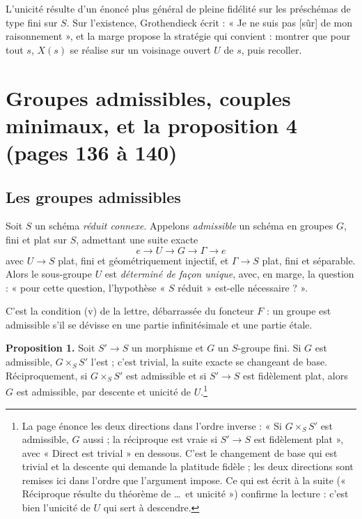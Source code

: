 \documentclass[11pt,a4paper]{article}
\begin{document}

L'unicité résulte d'un énoncé plus général de pleine fidélité sur les
préschémas de type fini sur $S$. Sur l'existence, Grothendieck écrit : « Je ne
suis pas [sûr] de mon raisonnement », et la marge propose la stratégie qui
convient : montrer que pour tout $s$, $X(s)$ se réalise sur un voisinage ouvert
$U$ de $s$, puis recoller.

\section*{Groupes admissibles, couples minimaux, et la proposition 4 (pages 136 à 140)}

\subsection*{Les groupes admissibles}

Soit $S$ un schéma \emph{réduit connexe}. Appelons \emph{admissible} un schéma
en groupes $G$, fini et plat sur $S$, admettant une suite exacte
\[
  e \longrightarrow U \longrightarrow G \longrightarrow \Gamma \longrightarrow
  e
\]
avec $U \to S$ plat, fini et géométriquement injectif, et $\Gamma \to S$ plat,
fini et séparable. Alors le sous-groupe $U$ est \emph{déterminé de façon
unique}, avec, en marge, la question : « pour cette question, l'hypothèse
« $S$ réduit » est-elle nécessaire ? ».

C'est la condition (v) de la lettre, débarrassée du foncteur $F$ : un groupe
est admissible s'il se dévisse en une partie infinitésimale et une partie
étale.

\textbf{Proposition 1.} Soit $S' \to S$ un morphisme et $G$ un $S$-groupe fini.
Si $G$ est admissible, $G \times_{S} S'$ l'est ; c'est trivial, la suite
exacte se changeant de base. Réciproquement, si $G \times_{S} S'$ est admissible
et si $S' \to S$ est fidèlement plat, alors $G$ est admissible, par descente et
unicité de $U$.\footnote{La page énonce les deux directions dans l'ordre
inverse : « Si $G \times_{S} S'$ est admissible, $G$ aussi ; la réciproque est
vraie si $S' \to S$ est fidèlement plat », avec « Direct est trivial » en
dessous. C'est le changement de base qui est trivial et la descente qui demande
la platitude fidèle ; les deux directions sont remises ici dans l'ordre que
l'argument impose. Ce qui est écrit à la suite (« Réciproque résulte du
théorème de …\ et unicité ») confirme la lecture : c'est bien l'unicité
de $U$ qui sert à descendre.}
\end{document}
